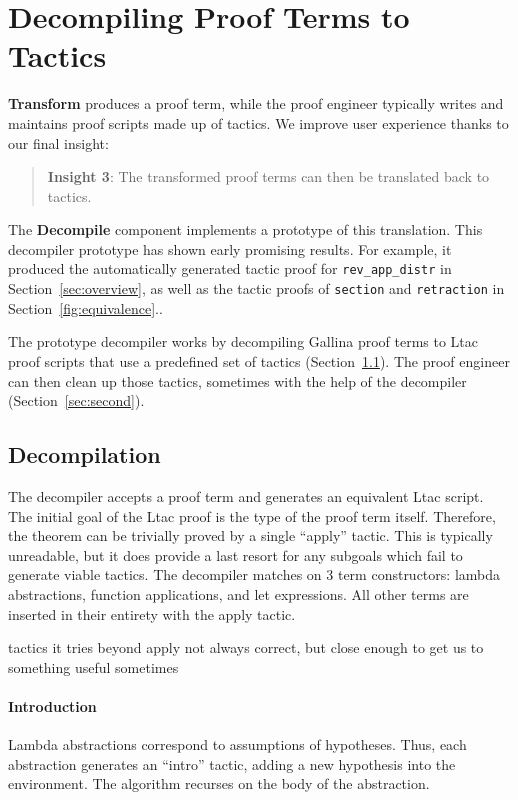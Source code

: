 \section{Decompiling Proof Terms to Tactics}
\label{sec:decompiler}

\textbf{Transform} produces a proof term,
while the proof engineer typically writes and maintains proof scripts made up of tactics.
We improve user experience thanks to our final insight:

\begin{quote}
\textbf{Insight 3}: The transformed proof terms can then be translated back to tactics.
\end{quote}

The \textbf{Decompile} component implements a prototype of this translation.
This decompiler prototype has shown early promising results.
For example, it produced the automatically generated tactic proof for \lstinline{rev_app_distr} 
in Section~\ref{sec:overview}, as well as the tactic proofs of \lstinline{section}
and \lstinline{retraction} in Section~\ref{fig:equivalence}..

The prototype decompiler works by decompiling Gallina proof terms to Ltac proof scripts that use a predefined set of tactics (Section~\ref{sec:first}).
The proof engineer can then clean up those tactics, sometimes with the help of the decompiler (Section~\ref{sec:second}).

\subsection{Decompilation}
\label{sec:first}

The decompiler accepts a proof term and generates an equivalent Ltac script. 
The initial goal of the Ltac proof is the type of the proof term itself. Therefore, the theorem can be trivially proved by a single “apply” tactic. This is typically unreadable, but it does provide a last resort for any subgoals which fail to generate viable tactics.
The decompiler matches on 3 term constructors: lambda abstractions, function applications, and let expressions. All other terms are inserted in their entirety with the apply tactic. 

tactics it tries beyond apply not always correct, but close enough to get us to something useful sometimes

\paragraph{Introduction}
Lambda abstractions correspond to assumptions of hypotheses. Thus, each abstraction generates an “intro” tactic, adding a new hypothesis into the environment. The algorithm recurses on the body of the abstraction.


